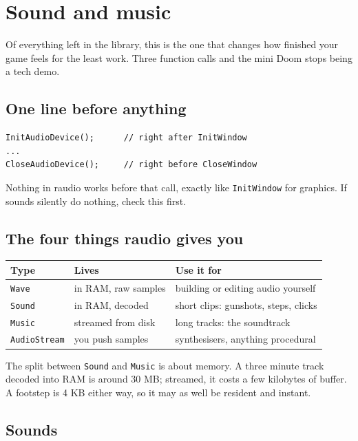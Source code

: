 \chapter{Sound and music}

Of everything left in the library, this is the one that changes how finished your
game feels for the least work. Three function calls and the mini Doom stops being
a tech demo.

\section{One line before anything}

\begin{lstlisting}
InitAudioDevice();      // right after InitWindow
...
CloseAudioDevice();     // right before CloseWindow
\end{lstlisting}

Nothing in raudio works before that call, exactly like \lstinline|InitWindow| for
graphics. If sounds silently do nothing, check this first.

\section{The four things raudio gives you}

\begin{center}
\begin{tabular}{@{}llp{6.4cm}@{}}
\toprule
\textbf{Type} & \textbf{Lives} & \textbf{Use it for} \\
\midrule
\lstinline|Wave| & in RAM, raw samples & building or editing audio yourself \\
\lstinline|Sound| & in RAM, decoded & short clips: gunshots, steps, clicks \\
\lstinline|Music| & streamed from disk & long tracks: the soundtrack \\
\lstinline|AudioStream| & you push samples & synthesisers, anything procedural \\
\bottomrule
\end{tabular}
\end{center}

The split between \lstinline|Sound| and \lstinline|Music| is about memory. A
three minute track decoded into RAM is around 30 MB; streamed, it costs a few
kilobytes of buffer. A footstep is 4 KB either way, so it may as well be resident
and instant.

\section{Sounds}

